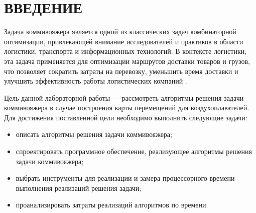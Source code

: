 \chapter*{ВВЕДЕНИЕ}

Задача коммивояжера является одной из классических задач комбинаторной оптимизации, привлекающей внимание исследователей и практиков в области логистики, транспорта и информационных технологий.
В контексте логистики, эта задача применяется для оптимизации маршрутов доставки товаров и грузов, что позволяет сократить затраты на перевозку, уменьшить время доставки и улучшить эффективность работы логистических компаний \cite{intro}.

Цель данной лабораторной работы --- рассмотреть алгоритмы решения задачи коммивояжера в случае построения карты перемещений для воздухоплавателей.
Для достижения поставленной цели необходимо выполнить следующие задачи:
\begin{itemize}
	\item описать алгоритмы решения задачи коммивояжера;
	\item спроектировать программное обеспечение, реализующее алгоритмы решения задачи коммивояжера;
	\item выбрать инструменты для реализации и замера процессорного времени
	выполнения реализаций решения задачи;
	\item проанализировать затраты реализаций алгоритмов по времени.
\end{itemize}
